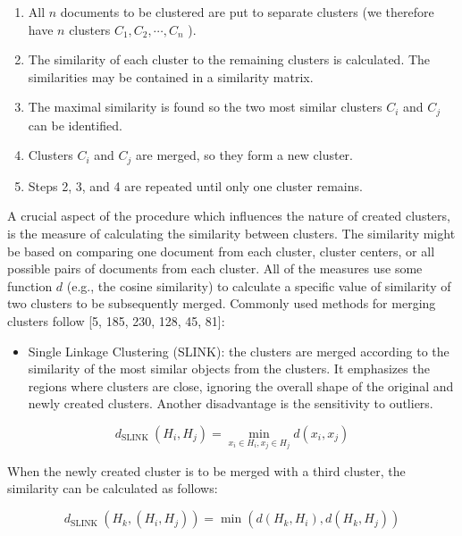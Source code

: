 \documentclass[10pt]{book}
\begin{document}
\begin{enumerate}
  \item All $n$ documents to be clustered are put to separate clusters (we therefore have $n$ clusters $C_{1}, C_{2}, \cdots, C_{n}$ ).
  \item The similarity of each cluster to the remaining clusters is calculated. The similarities may be contained in a similarity matrix.
  \item The maximal similarity is found so the two most similar clusters $C_{i}$ and $C_{j}$ can be identified.
  \item Clusters $C_{i}$ and $C_{j}$ are merged, so they form a new cluster.
  \item Steps 2, 3, and 4 are repeated until only one cluster remains.
\end{enumerate}

A crucial aspect of the procedure which influences the nature of created clusters, is the measure of calculating the similarity between clusters. The similarity might be based on comparing one document from each cluster, cluster centers, or all possible pairs of documents from each cluster. All of the measures use some function $d$ (e.g., the cosine similarity) to calculate a specific value of similarity of two clusters to be subsequently merged. Commonly used methods for merging clusters follow [5, 185, 230, 128, 45, 81]:

\begin{itemize}
  \item Single Linkage Clustering (SLINK): the clusters are merged according to the similarity of the most similar objects from the clusters. It emphasizes the regions where clusters are close, ignoring the overall shape of the original and newly created clusters. Another disadvantage is the sensitivity to outliers.
\end{itemize}


\begin{equation*}
d_{\text {SLINK }}\left(H_{i}, H_{j}\right)=\min _{x_{i} \in H_{i}, x_{j} \in H_{j}} d\left(x_{i}, x_{j}\right) \tag{12.25}
\end{equation*}


When the newly created cluster is to be merged with a third cluster, the similarity can be calculated as follows:


\begin{equation*}
d_{\text {SLINK }}\left(H_{k},\left(H_{i}, H_{j}\right)\right)=\min \left(d\left(H_{k}, H_{i}\right), d\left(H_{k}, H_{j}\right)\right) \tag{12.26}
\end{equation*}
\end{document}
